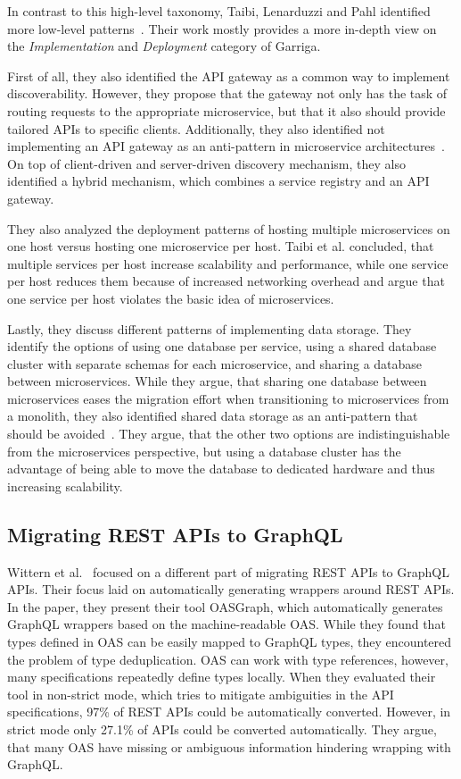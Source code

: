 In contrast to this high-level taxonomy, Taibi, Lenarduzzi and Pahl identified more low-level patterns~\cite{Taibi2018}.
Their work mostly provides a more in-depth view on the \textit{Implementation} and \textit{Deployment} category of Garriga.

First of all, they also identified the \ac{API} gateway as a common way to implement discoverability.
However, they propose that the gateway not only has the task of routing requests to the appropriate microservice, but that it also should provide tailored \acp{API} to specific clients.
Additionally, they also identified not implementing an \ac{API} gateway as an anti-pattern in microservice architectures~\cite{Taibi2020}.
On top of client-driven and server-driven discovery mechanism, they also identified a hybrid mechanism, which combines a service registry and an \ac{API} gateway.

They also analyzed the deployment patterns of hosting multiple microservices on one host versus hosting one microservice per host.
Taibi et al. concluded, that multiple services per host increase scalability and performance, while one service per host reduces them because of increased networking overhead and argue that one service per host violates the basic idea of microservices.

Lastly, they discuss different patterns of implementing data storage.
They identify the options of using one database per service, using a shared database cluster with separate schemas for each microservice, and sharing a database between microservices.
While they argue, that sharing one database between microservices eases the migration effort when transitioning to microservices from a monolith, they also identified shared data storage as an anti-pattern that should be avoided~\cite{Taibi2020}.
They argue, that the other two options are indistinguishable from the microservices perspective, but using a database cluster has the advantage of being able to move the database to dedicated hardware and thus increasing scalability.

\subsection{Migrating \acs{REST} \acsp{API} to GraphQL}\label{sec:rel-2}

Wittern et al.~\cite{Wittern2019} focused on a different part of migrating \ac{REST} \acp{API} to GraphQL \acp{API}.
Their focus laid on automatically generating wrappers around \ac{REST} \acp{API}.
In the paper, they present their tool \acs{OAS}Graph, which automatically generates GraphQL wrappers based on the machine-readable \ac{OAS}.
While they found that types defined in \ac{OAS} can be easily mapped to GraphQL types, they encountered the problem of type deduplication.
\ac{OAS} can work with type references, however, many specifications repeatedly define types locally.
When they evaluated their tool in non-strict mode, which tries to mitigate ambiguities in the \ac{API} specifications, 97\% of \ac{REST} \acp{API} could be automatically converted.
However, in strict mode only 27.1\% of \acp{API} could be converted automatically.
They argue, that many \ac{OAS} have missing or ambiguous information hindering wrapping with GraphQL.

